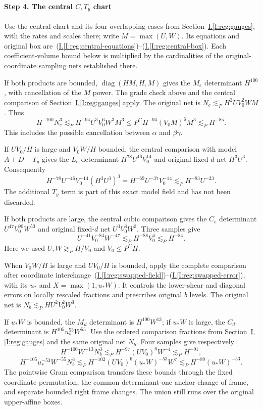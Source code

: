 \documentclass[11pt]{amsart}
\theoremstyle{definition}
\theoremstyle{remark}
\numberwithin{equation}{section}
\newcommand{\partIref}[1]{\hyperref[I:#1]{I.\ref*{I:#1}}}
\newcommand{\partIeqref}[1]{\textup{(\partIref{#1})}}
\begin{document}
\paragraph{Step 4. The central $C,T_y$ chart}

Use the central chart and its four overlapping cases from Section~\partIref{reg:gauges}, with the rates and scales there; write $M=\max(U,W)$. Its equations and original box are~\partIeqref{reg:central-equations}--\partIeqref{reg:central-box}. Each coefficient-volume bound below is multiplied by the cardinalities of the original-coordinate sampling nets established there.

If both products are bounded, $\operatorname{diag}(HM,H,M)$ gives the $M_e$ determinant $H^{100}$, with cancellation of the $M$ power. The grade check above and the central comparison of Section~\partIref{reg:gauges} apply. The original net is $N_e\lesssim_PH^2UV_0^2WM$. Thus
\[
H^{-100}N_e^3\lesssim_PH^{-94}U^3V_0^6W^3M^3\le P^CH^{-94}(V_0M)^6M^3\lesssim_PH^{-85}.
\]
This includes the possible cancellation between $\alpha$ and $\beta\gamma$.

If $UV_0/H$ is large and $V_0W/H$ bounded, the central comparison with model $A+D+T_y$ gives the $L_e$ determinant $H^{78}U^{46}V_0^{14}$ and original fixed-$d$ net $H^3U^3$. Consequently
\[
H^{-78}U^{-46}V_0^{-14}(H^3U^3)^3=H^{-69}U^{-37}V_0^{-14}\lesssim_PH^{-83}U^{-23}.
\]
The additional $T_y$ term is part of this exact model field and has not been discarded.

If both products are large, the central cubic comparison gives the $C_e$ determinant $U^{47}V_0^{90}W^{53}$ and original fixed-$d$ net $U^3V_0^3W^3$. Three samples give
\[
U^{-41}V_0^{-84}W^{-47}\lesssim_PH^{-88}V_0^4\lesssim_PH^{-84}.
\]
Here we used $U,W\gtrsim_PH/V_0$ and $V_0\le P^CH$.

When $V_0W/H$ is large and $UV_0/H$ is bounded, apply the complete comparison after coordinate interchange~\partIeqref{reg:swapped-field}--\partIeqref{reg:swapped-error}, with its $u_*$ and $X=\max(1,u_*W)$. It controls the lower-shear and diagonal errors on locally rescaled fractions and prescribes original $b$ levels. The original net is $N_b\lesssim_PHU^2V_0^2W^3$.

If $u_*W$ is bounded, the $M_d$ determinant is $H^{100}W^{13}$; if $u_*W$ is large, the $C_d$ determinant is $H^{105}u_*^{53}W^{55}$. Use the ordered comparison fractions from Section~\partIref{reg:gauges} and the same original net $N_b$. Four samples give respectively
\[
H^{-100}W^{-13}N_b^3\lesssim_PH^{-97}(UV_0)^6W^{-4}\lesssim_PH^{-91},
\]
\[
H^{-105}u_*^{-53}W^{-55}N_b^3\lesssim_PH^{-102}(UV_0)^6(u_*W)^{-53}W^7\lesssim_PH^{-89}(u_*W)^{-53}.
\]
The pointwise Gram comparison transfers these bounds through the fixed coordinate permutation, the common determinant-one anchor change of frame, and separate bounded right frame changes. The union still runs over the original upper-affine boxes. 
\end{document}
